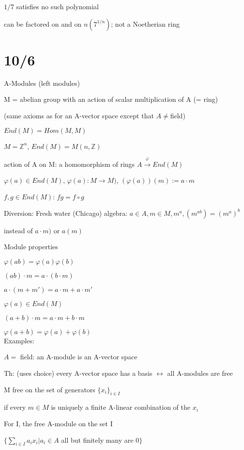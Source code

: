 \documentclass[12pt]{article}
\begin{document}
\noindent
$1/7$ satisfies no such polynomial

 can be factored on and on $n(7^{1/n})$; not a Noetherian ring

\section{10/6}

\noindent
A-Modules (left modules)

M = abelian group with an action of scalar multiplication of A (= ring)

(same axioms as for an A-vector space except that $A \neq $field)

\noindent
$End(M) = Hom(M, M)$

$M = \mathds{Z}^n$, $End(M) = M(n, \mathds{Z})$

action of A on M: a homomorphism of rings $A \xrightarrow{\varphi} End(M)$

$\varphi(a) \in End(M)$, $\varphi(a): M \to M)$, $(\varphi(a))(m) := a \cdot m$

$f, g \in End(M)$: $fg = f \circ g$

\noindent
Diversion: Fresh water (Chicago) algebra: $a \in A, m \in M, m^a, (m^{ab}) = (m^a)^b$

instead of $a \cdot m)$ or $a(m)$

\noindent
Module properties

$\varphi(ab) = \varphi(a)\varphi(b)$

$(ab) \cdot m = a \cdot (b \cdot m)$

$a \cdot (m + m') = a \cdot m + a \cdot m'$

$\varphi(a) \in End(M)$

$(a + b) \cdot m = a \cdot m + b \cdot m$

$\varphi(a + b) = \varphi(a) + \varphi(b)$\\

\noindent
Examples:

$A =$ field: an A-module is an A-vector space

Th: (uses choice) every A-vector space has a basis $\leftrightarrow$ all A-modules are free

\noindent
M free on the set of generators $\{x_i\}_{i \in I}$

if every $m \in M$ is uniquely a finite A-linear combination of the $x_i$

\noindent
For I, the free A-module on the set I

$\{\sum_{i \in I}a_ix_i | a_i \in A$ all but finitely many are 0$\}$
\end{document}
